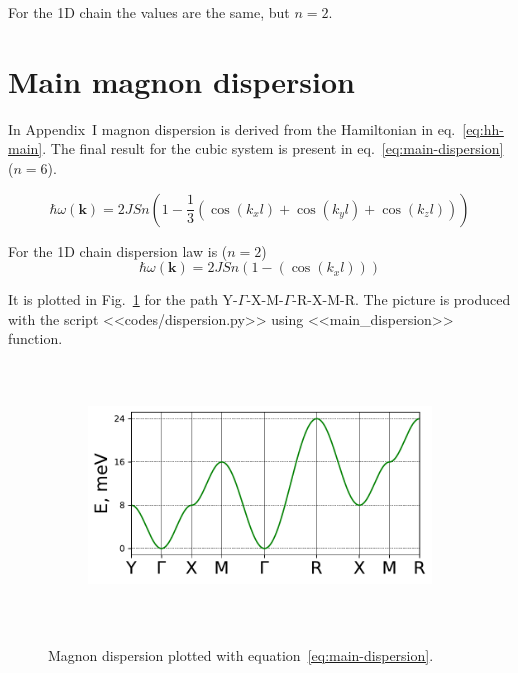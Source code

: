 \documentclass[a4paper,12pt]{article}
\begin{document}
        For the 1D chain the values are the same, but $n = 2$.

    \section{Main magnon dispersion}

        In Appendix~I magnon dispersion is derived from the Hamiltonian in eq.~\eqref{eq:hh-main}.
        The final result for the cubic system is present in eq.~\ref{eq:main-dispersion} ($n = 6$). 

        \begin{equation}
            \hbar\omega(\mathbf{k}) = 2JSn\left(1 - 
            \dfrac{1}{3}\left(\cos(k_x l) + \cos(k_y l) + \cos(k_z l)\right)\right)
            \label{eq:main-dispersion}
        \end{equation}

        For the 1D chain dispersion law is ($n = 2$)
        \begin{equation}
            \hbar\omega(\mathbf{k}) = 2JSn\left(1 - \left(\cos(k_x l)\right)\right)
            \label{eq:main-dispersion-1D}
        \end{equation}

        It is plotted in Fig.~\ref{fig:main-dispersion} for the path Y-$\Gamma$-X-M-$\Gamma$-R-X-M-R. 
        The picture is produced with the script <<codes/dispersion.py>> using 
        <<main\_dispersion>> function.


        \begin{figure}[H]
            \centering
            \begin{subfigure}[b]{0.8\textwidth}
                \centering
                \includegraphics[height=7cm]{main_dispersion.pdf}
            \end{subfigure}
            \hfill
            \caption{Magnon dispersion plotted with equation~\eqref{eq:main-dispersion}.}
            \label{fig:main-dispersion}
        \end{figure}
\end{document}
